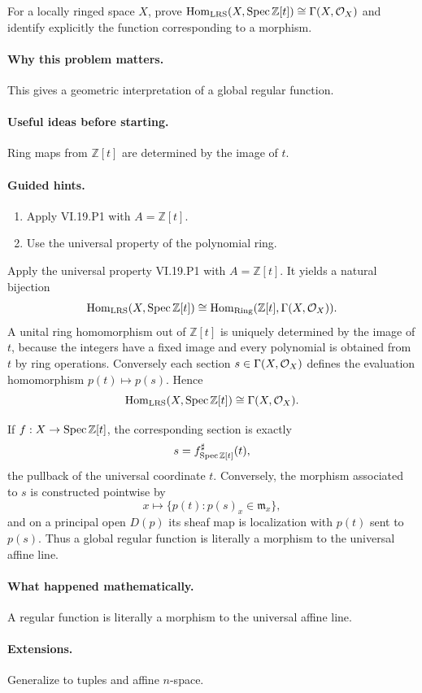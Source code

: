 \begin{problem}\label{prob:vi19-p10}
For a locally ringed space $X$, prove $\operatorname{Hom}_{\mathrm{LRS}}(X,\operatorname{Spec}\mathbb Z[t])\cong\Gamma(X,\mathcal O_X)$ and identify explicitly the function corresponding to a morphism.
\end{problem}

\ifdefined\FullProblemDossiers
\paragraph{Why this problem matters.}
This gives a geometric interpretation of a global regular function.

\paragraph{Useful ideas before starting.}
Ring maps from $\mathbb Z[t]$ are determined by the image of $t$.

\paragraph{Guided hints.}
\begin{enumerate}
\item Apply VI.19.P1 with $A=\mathbb Z[t]$.
\item Use the universal property of the polynomial ring.
\end{enumerate}

\begin{solution}
Apply the universal property VI.19.P1 with \(A=\mathbb Z[t]\).  It yields a natural bijection
\[
\operatorname{Hom}_{\mathrm{LRS}}(X,\operatorname{Spec}\mathbb Z[t])
\cong
\operatorname{Hom}_{\mathrm{Ring}}(\mathbb Z[t],\Gamma(X,\mathcal O_X)).
\]
A unital ring homomorphism out of \(\mathbb Z[t]\) is uniquely determined by the image of \(t\), because the integers have a fixed image and every polynomial is obtained from \(t\) by ring operations.  Conversely each section \(s\in\Gamma(X,\mathcal O_X)\) defines the evaluation homomorphism \(p(t)\mapsto p(s)\).  Hence
\[
\operatorname{Hom}_{\mathrm{LRS}}(X,\operatorname{Spec}\mathbb Z[t])
\cong\Gamma(X,\mathcal O_X).
\]

If \(f:X\to\operatorname{Spec}\mathbb Z[t]\), the corresponding section is exactly
\[
s=f^\sharp_{\operatorname{Spec}\mathbb Z[t]}(t),
\]
the pullback of the universal coordinate \(t\).  Conversely, the morphism associated to \(s\) is constructed pointwise by
\[
x\longmapsto\{p(t):p(s)_x\in\mathfrak m_x\},
\]
and on a principal open \(D(p)\) its sheaf map is localization with \(p(t)\) sent to \(p(s)\).  Thus a global regular function is literally a morphism to the universal affine line.
\end{solution}

\paragraph{What happened mathematically.}
A regular function is literally a morphism to the universal affine line.

\paragraph{Extensions.}
Generalize to tuples and affine $n$-space.
\fi

